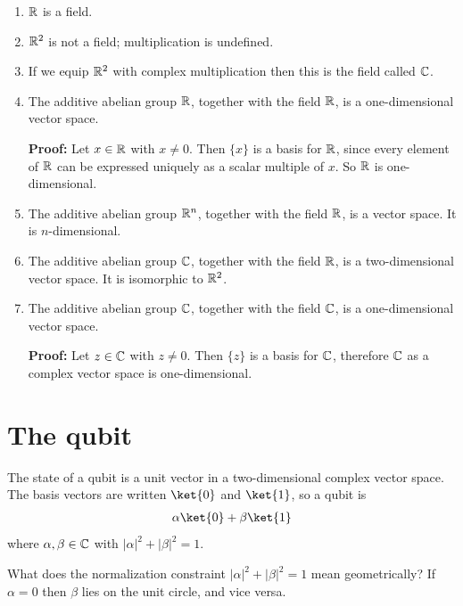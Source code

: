 \begin{enumerate}
\item $\mathbb{R}$ is a field.

\item $\mathbb{R}^2$ is not a field; multiplication is undefined.

\item If we equip $\mathbb{R}^2$ with complex multiplication then this is the field called $\mathbb{C}$.

\item The additive abelian group $\mathbb{R}$, together with the field $\mathbb{R}$, is a one-dimensional vector space.

  {\bf Proof:} Let $x \in \mathbb{R}$ with $x \neq 0$. Then $\{x\}$ is a basis for $\mathbb{R}$, since every element of $\mathbb{R}$ can
  be expressed uniquely as a scalar multiple of $x$. So $\mathbb{R}$ is one-dimensional.

\item The additive abelian group $\mathbb{R}^n$, together with the field $\mathbb{R}$, is a vector space. It is $n$-dimensional.

\item The additive abelian group $\mathbb{C}$, together with the field $\mathbb{R}$, is a two-dimensional vector
  space. It is isomorphic to $\mathbb{R}^2$.

\item The additive abelian group $\mathbb{C}$, together with the field $\mathbb{C}$, is a one-dimensional vector space.

  {\bf Proof:} Let $z \in \mathbb{C}$ with $z \neq 0$. Then $\{z\}$ is a basis for $\mathbb{C}$, therefore $\mathbb{C}$ as a
  complex vector space is one-dimensional.

\end{enumerate}

\newpage
\section{The qubit}
The state of a qubit is a unit vector in a two-dimensional complex vector space. The basis vectors
are written $\ket{0}$ and $\ket{1}$, so a qubit is
\begin{align*}
\alpha\ket{0} + \beta\ket{1}
\end{align*}
where $\alpha, \beta \in \mathbb{C}$ with $|\alpha|^2 + |\beta|^2 = 1$.

What does the normalization constraint $|\alpha|^2 + |\beta|^2 = 1$ mean geometrically? If
$\alpha = 0$ then $\beta$ lies on the unit circle, and vice versa.

